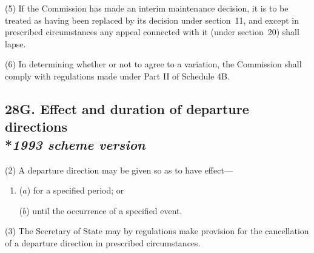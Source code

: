 \documentclass[12pt,a4paper]{article}
\begin{document}
(5) If the 
Commission  %
has made an interim maintenance decision, it is to be treated as having been replaced by 
its  %
decision under section~11, and except in prescribed circumstances any appeal connected with it (under section~20) shall lapse.

(6) In determining whether or not to agree to a variation, the 
Commission  %
shall comply with regulations made under Part II of Schedule 4B.


\subsection[28G. Effect and duration of departure directions --- \emph{1993 scheme version}]{28G. Effect and duration of departure directions\\*\emph{1993 scheme version}}


(2) A departure direction may be given so as to have effect—
\begin{enumerate}\item[]
($a$) for a specified period; or

($b$) until the occurrence of a specified event.
\end{enumerate}

(3) The Secretary of State may by regulations make provision for the cancellation of a departure direction in prescribed circumstances.
\end{document}
